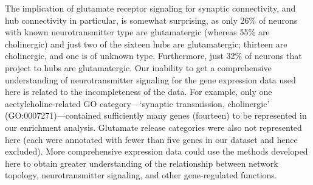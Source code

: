 \documentclass[10pt,letterpaper]{article}
\begin{document}
The implication of glutamate receptor signaling for synaptic connectivity, and hub connectivity in particular, is somewhat surprising, as only 26\% of neurons with known neurotransmitter type are glutamatergic (whereas 55\% are cholinergic) and just two of the sixteen hubs are glutamatergic; thirteen are cholinergic, and one is of unknown type.
Furthermore, just 32\% of neurons that project to hubs are glutamatergic.
Our inability to get a comprehensive understanding of neurotransmitter signaling for the gene expression data used here is related to the incompleteness of the data.
For example, only one acetylcholine-related GO category---`synaptic transmission, cholinergic' (GO:0007271)---contained sufficiently many genes (fourteen) to be represented in our enrichment analysis.
Glutamate release categories were also not represented here (each were annotated with fewer than five genes in our dataset and hence excluded).
More comprehensive expression data could use the methods developed here to obtain greater understanding of the relationship between network topology, neurotransmitter signaling, and other gene-regulated functions.

\end{document}
